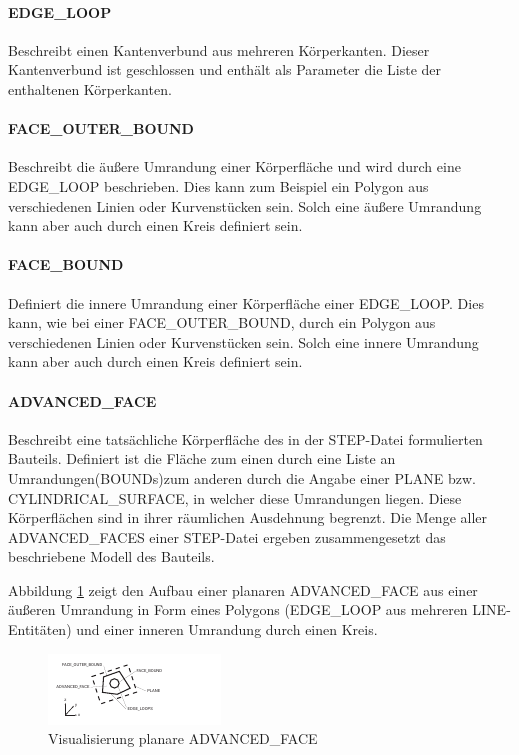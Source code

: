 \paragraph{EDGE\_LOOP}

Beschreibt einen Kantenverbund aus mehreren Körperkanten. Dieser Kantenverbund ist geschlossen und enthält als Parameter die Liste der enthaltenen Körperkanten. 

\paragraph{FACE\_OUTER\_BOUND}

Beschreibt die äußere Umrandung einer Körperfläche und wird durch eine EDGE\_LOOP beschrieben. Dies kann zum Beispiel ein Polygon aus verschiedenen Linien oder Kurvenstücken sein. Solch eine äußere Umrandung kann aber auch durch einen Kreis definiert sein.

\paragraph{FACE\_BOUND}

Definiert die innere Umrandung einer Körperfläche einer EDGE\_LOOP. Dies kann, wie bei einer FACE\_OUTER\_BOUND, durch ein Polygon aus verschiedenen Linien oder Kurvenstücken sein. Solch eine innere Umrandung kann aber auch durch einen Kreis definiert sein.   

\paragraph{ADVANCED\_FACE}

Beschreibt eine tatsächliche Körperfläche des in der STEP-Datei formulierten Bauteils. Definiert ist die Fläche zum einen durch eine Liste an Umrandungen(BOUNDs)zum anderen durch die Angabe einer PLANE bzw. CYLINDRICAL\_SURFACE, in welcher diese Umrandungen liegen. Diese Körperflächen sind in ihrer räumlichen Ausdehnung begrenzt. Die Menge aller ADVANCED\_FACES einer STEP-Datei ergeben zusammengesetzt das beschriebene Modell des Bauteils. 

Abbildung \ref{fig:advancedfaceentity} zeigt den Aufbau einer planaren ADVANCED\_FACE aus einer äußeren Umrandung in Form eines Polygons (EDGE\_LOOP aus mehreren LINE-Entitäten) und einer inneren Umrandung durch einen Kreis.  

\begin{figure}[h]
	\centering
	
	\includegraphics[width=0.7\linewidth]{img/advancedface_entity.pdf}
	
	\caption{Visualisierung planare ADVANCED\_FACE}
	\label{fig:advancedfaceentity}
	
\end{figure}

